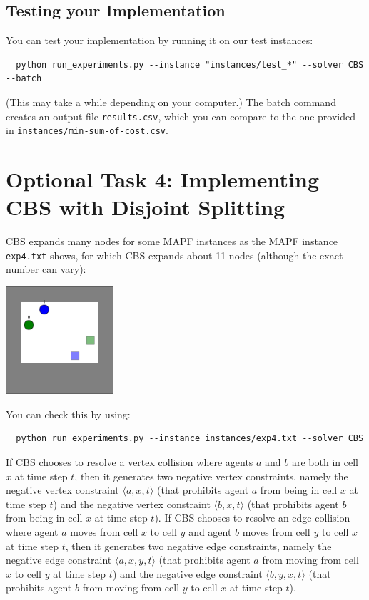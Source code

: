 \documentclass[11pt]{article}
\begin{document}
\subsection{Testing your Implementation}

You can test your implementation by running it on our test instances:

\begin{verbatim}
  python run_experiments.py --instance "instances/test_*" --solver CBS --batch
\end{verbatim}

(This may take a while depending on your computer.) The batch command creates an output file \texttt{results.csv}, which you can compare to the one provided in \texttt{instances/min-sum-of-cost.csv}.

\section{Optional Task 4: Implementing CBS with Disjoint Splitting}

CBS expands many nodes for some MAPF instances as the MAPF instance \texttt{exp4.txt} shows, for which CBS expands about 11 nodes (although the exact number can vary):

\begin{center}
\includegraphics[width=0.3\textwidth]{images/exp4.png}
\end{center}

You can check this by using:

\begin{verbatim}
  python run_experiments.py --instance instances/exp4.txt --solver CBS
\end{verbatim}

If CBS chooses to resolve a vertex collision where agents $a$ and $b$ are both in cell $x$ at time step $t$, then it generates two negative vertex constraints, namely the negative vertex constraint $\langle a,x,t \rangle$ (that prohibits agent $a$ from being in cell $x$ at time step $t$) and the negative vertex constraint $\langle b,x,t \rangle$ (that prohibits agent $b$ from being in cell $x$ at time step $t$). If CBS chooses to resolve an edge collision where agent $a$ moves from cell $x$ to cell $y$ and agent $b$ moves from cell $y$ to cell $x$ at time step $t$, then it generates two negative edge constraints, namely the negative edge constraint $\langle a,x,y,t \rangle$ (that prohibits agent $a$ from moving from cell $x$ to cell $y$ at time step $t$) and the negative edge constraint $\langle b,y,x,t \rangle$ (that prohibits agent $b$ from moving from cell $y$ to cell $x$ at time step $t$). 
\end{document}
